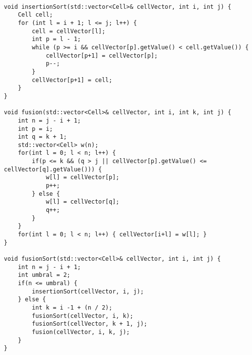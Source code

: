 \begin{lstlisting}

void insertionSort(std::vector<Cell>& cellVector, int i, int j) {
    Cell cell;
    for (int l = i + 1; l <= j; l++) {
        cell = cellVector[l];
        int p = l - 1;
        while (p >= i && cellVector[p].getValue() < cell.getValue()) {
            cellVector[p+1] = cellVector[p];
            p--;
        }
        cellVector[p+1] = cell;
    }
}

void fusion(std::vector<Cell>& cellVector, int i, int k, int j) {
    int n = j - i + 1;
    int p = i;
    int q = k + 1;
    std::vector<Cell> w(n);
    for(int l = 0; l < n; l++) {
        if(p <= k && (q > j || cellVector[p].getValue() <= cellVector[q].getValue())) {
            w[l] = cellVector[p];
            p++;
        } else {
            w[l] = cellVector[q];
            q++;
        }
    }
    for(int l = 0; l < n; l++) { cellVector[i+l] = w[l]; }
}

void fusionSort(std::vector<Cell>& cellVector, int i, int j) {
    int n = j - i + 1;
    int umbral = 2;
    if(n <= umbral) {
        insertionSort(cellVector, i, j);
    } else {
        int k = i -1 + (n / 2);
        fusionSort(cellVector, i, k);
        fusionSort(cellVector, k + 1, j);
        fusion(cellVector, i, k, j);
    }
}

\end{lstlisting}